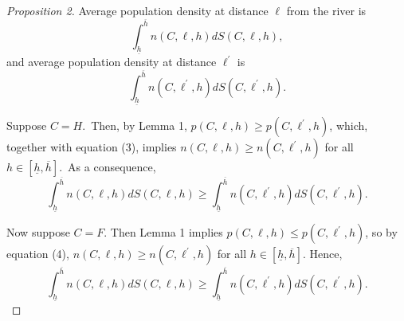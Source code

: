 \documentclass[12pt]{article}
\begin{document}
\begin{proof}[Proposition 2]
Average population density at distance $\ell $ from the river is%
\begin{equation*}
\int_{\underline{h}}^{\overline{h}}n\left( C,\ell ,h\right) dS\left( C,\ell
,h\right) ,
\end{equation*}%
and average population density at distance $\ell ^{\prime }$ is%
\begin{equation*}
\int_{\underline{h}}^{\overline{h}}n\left( C,\ell ^{\prime },h\right)
dS\left( C,\ell ^{\prime },h\right) .
\end{equation*}

Suppose $C=H$.\ Then, by Lemma 1, $p\left( C,\ell ,h\right) \geq p\left(
C,\ell ^{\prime },h\right) $, which, together with equation (3), implies $%
n\left( C,\ell ,h\right) \geq n\left( C,\ell ^{\prime },h\right) $ for all $%
h\in \left[ \underline{h},\overline{h}\right] $.\ As a consequence,%
\begin{equation*}
\int_{\underline{h}}^{\overline{h}}n\left( C,\ell ,h\right) dS\left( C,\ell
,h\right) \geq \int_{\underline{h}}^{\overline{h}}n\left( C,\ell ^{\prime
},h\right) dS\left( C,\ell ^{\prime },h\right) .
\end{equation*}

Now suppose $C=F$. Then Lemma 1 implies $p\left( C,\ell ,h\right) \leq
p\left( C,\ell ^{\prime },h\right) $, so by equation (4), $n\left( C,\ell
,h\right) \geq n\left( C,\ell ^{\prime },h\right) $ for all $h\in \left[ 
\underline{h},\overline{h}\right] $. Hence,%
\begin{equation*}
\int_{\underline{h}}^{\overline{h}}n\left( C,\ell ,h\right) dS\left( C,\ell
,h\right) \geq \int_{\underline{h}}^{\overline{h}}n\left( C,\ell ^{\prime
},h\right) dS\left( C,\ell ^{\prime },h\right) .
\end{equation*}
\end{proof}
\end{document}
